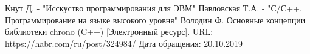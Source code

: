 


\begin{thebibliography}{}
     Кнут Д. - "Исскуство программирования для ЭВМ"
     Павловская Т.А. - "С/С++. Программирование на языке высокого уровня"
      Володин Ф. Основные концепции библиотеки chrono (C++) [Электронный ресурс]. URL: https://habr.com/ru/post/324984/ Дата обращения: 20.10.2019
\end{thebibliography}

